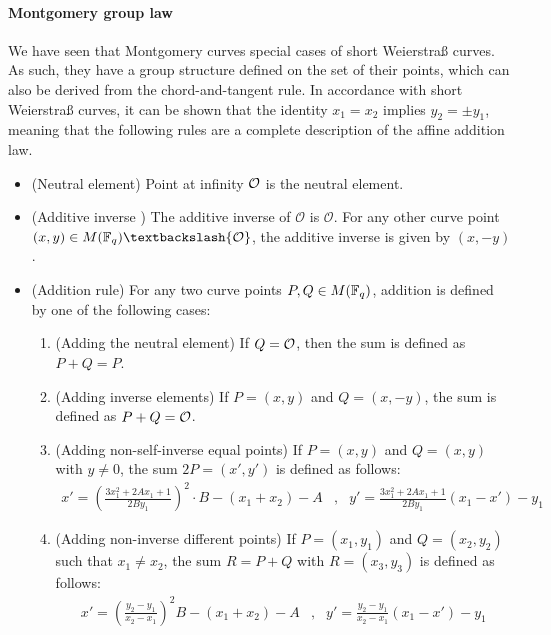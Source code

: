 \paragraph{Montgomery group law} We have seen that Montgomery curves special cases of short Weierstraß curves. As such, they have a group structure defined on the set of their points, which can also be derived from the chord-and-tangent rule. In accordance with short Weierstraß curves, it can be shown that the identity $x_1=x_2$ implies $y_2=\pm y_1$, meaning that the following rules are a complete description of the affine addition law.

\begin{definition}{}\label{def:montgomery-group-law}
\begin{itemize}
\item (Neutral element) Point at infinity $\mathcal{O}$ is the neutral element.
\item (Additive inverse ) The additive inverse of $\mathcal{O}$ is $\mathcal{O}$. For any other curve point $(x,y) \in M(\F_q)\textbackslash \{\mathcal{O}\}$, the additive inverse is given by $(x,-y)$.
\item (Addition rule) For any two curve points $P, Q \in M(\mathbb{F}_q)$, addition is defined by one of the following cases:
\begin{enumerate}
\item (Adding the neutral element) If $Q=\mathcal{O}$, then the sum is defined as $P+Q=P$.
\item (Adding inverse elements)  If $P=(x,y)$ and $Q=(x,-y)$, the sum is defined as $P+Q=\mathcal{O}$.
\item (Adding non-self-inverse equal points) If $P=(x,y)$ and $Q=(x,y)$ with $y\neq 0$, the sum $2P=(x',y')$ is defined as follows:
$$
\begin{array}{llr}
x' = (\frac{3x_1^2 + 2A x_1 +1}{2By_1})^2\cdot B - (x_1 + x_2) - A &,&
y' = \frac{3x_1^2 + 2A x_1 +1}{2By_1}(x_1-x') - y_1
\end{array} 
$$
\item (Adding non-inverse different points) If $P=(x_1,y_1)$ and $Q=(x_2,y_2)$ such that $x_1 \neq x_2$, the sum $R=P+Q$ with $R=(x_3,y_3)$ is defined as follows:
$$
\begin{array}{llr}
x' = (\frac{y_2-y_1}{x_2-x_1})^2B - (x_1 + x_2) - A &, &
y' = \frac{y_2-y_1}{x_2-x_1}(x_1-x') - y_1
\end{array} 
$$
\end{enumerate}
\end{itemize} 
\end{definition}
